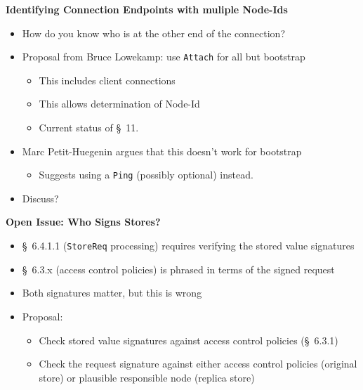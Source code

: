 \documentclass[helvetica]{seminar}
\newcommand{\heading}[1]{%
  \begin{center} 
    \large\bf 
    #1 
  \end{center} 
  \vspace{.4 in}}
\begin{document}
\begin{slide}
\heading{Identifying Connection Endpoints with muliple Node-Ids}

\begin{itemize}
\item How do you know who is at the other end of the connection?
\end{itemize}
\begin{itemize}
\item Proposal from Bruce Lowekamp: use \verb^Attach^ for all but bootstrap
  \begin{itemize}
  \item This includes client connections
  \item This allows determination of Node-Id
  \item Current status of \S\ 11.
  \end{itemize}

\item Marc Petit-Huegenin argues that this doesn't work for bootstrap
  \begin{itemize}
  \item Suggests using a \verb^Ping^ (possibly optional) instead.
  \end{itemize}

\item Discuss?
\end{itemize}
\end{slide}



\begin{slide}
\heading{Open Issue: Who Signs Stores?}

\begin{itemize}
\item \S\ 6.4.1.1 (\verb^StoreReq^ processing) requires verifying the stored value signatures
\item \S\ 6.3.x (access control policies) is phrased in terms of the signed request

\item Both signatures matter, but this is wrong
\item Proposal:
  \begin{itemize}
  \item Check stored value signatures against access control policies (\S\ 6.3.1)
  \item Check the request signature against either access control policies (original store) or plausible responsible node (replica store)
  \end{itemize}
\end{itemize}
\end{slide}
\end{document}
